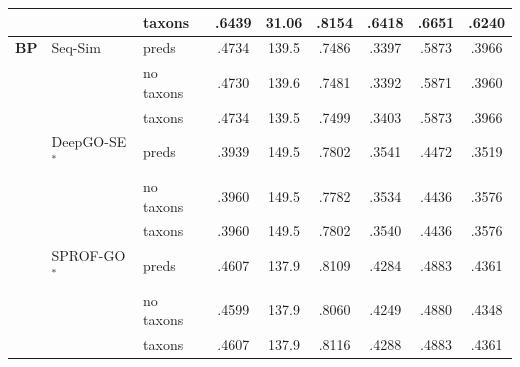 \begin{table}[!h]
\begin{tabular}{lll*{6}c}
            &                         & taxons     & .6439 & 31.06 & .8154 & .6418 & .6651 & .6240 \\
\midrule
\textbf{BP} & Seq-Sim                 & preds      & .4734 & 139.5 & .7486 & .3397 & .5873 & .3966 \\
            &                         & no taxons  & .4730 & 139.6 & .7481 & .3392 & .5871 & .3960 \\
            &                         & taxons     & .4734 & 139.5 & .7499 & .3403 & .5873 & .3966 \\
            & DeepGO-SE$^\ast$         & preds      & .3939 & 149.5 & .7802 & .3541 & .4472 & .3519 \\
            &                         & no taxons  & .3960 & 149.5 & .7782 & .3534 & .4436 & .3576 \\
            &                         & taxons     & .3960 & 149.5 & .7802 & .3540 & .4436 & .3576 \\
            & SPROF-GO$^\ast$          & preds      & .4607 & 137.9 & .8109 & .4284 & .4883 & .4361 \\
            &                         & no taxons  & .4599 & 137.9 & .8060 & .4249 & .4880 & .4348 \\
            &                         & taxons     & .4607 & 137.9 & .8116 & .4288 & .4883 & .4361 \\
\bottomrule
\end{tabular}
\end{table}
